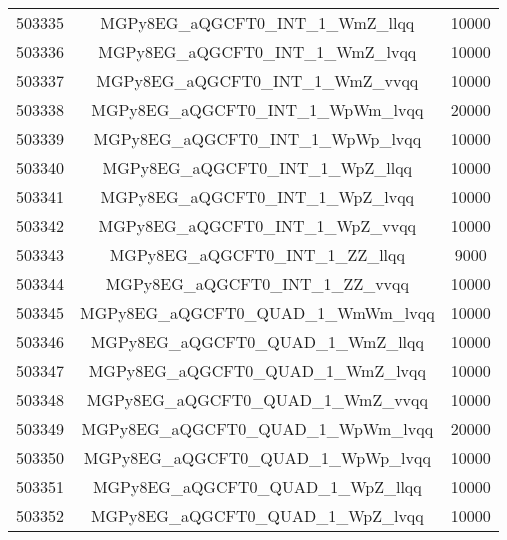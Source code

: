 \begin{table}[!htbp]
\begin{center}
\begin{tabular}{c|c|c}
503335 & MGPy8EG\_aQGCFT0\_INT\_1\_WmZ\_llqq     & 10000 \\
503336 & MGPy8EG\_aQGCFT0\_INT\_1\_WmZ\_lvqq     & 10000 \\
503337 & MGPy8EG\_aQGCFT0\_INT\_1\_WmZ\_vvqq     & 10000 \\
503338 & MGPy8EG\_aQGCFT0\_INT\_1\_WpWm\_lvqq    & 20000 \\
503339 & MGPy8EG\_aQGCFT0\_INT\_1\_WpWp\_lvqq    & 10000 \\
503340 & MGPy8EG\_aQGCFT0\_INT\_1\_WpZ\_llqq     & 10000 \\
503341 & MGPy8EG\_aQGCFT0\_INT\_1\_WpZ\_lvqq     & 10000 \\
503342 & MGPy8EG\_aQGCFT0\_INT\_1\_WpZ\_vvqq     & 10000 \\
503343 & MGPy8EG\_aQGCFT0\_INT\_1\_ZZ\_llqq      & 9000 \\
503344 & MGPy8EG\_aQGCFT0\_INT\_1\_ZZ\_vvqq      & 10000 \\
503345 & MGPy8EG\_aQGCFT0\_QUAD\_1\_WmWm\_lvqq   & 10000 \\
503346 & MGPy8EG\_aQGCFT0\_QUAD\_1\_WmZ\_llqq    & 10000 \\
503347 & MGPy8EG\_aQGCFT0\_QUAD\_1\_WmZ\_lvqq    & 10000 \\
503348 & MGPy8EG\_aQGCFT0\_QUAD\_1\_WmZ\_vvqq    & 10000 \\
503349 & MGPy8EG\_aQGCFT0\_QUAD\_1\_WpWm\_lvqq   & 20000 \\
503350 & MGPy8EG\_aQGCFT0\_QUAD\_1\_WpWp\_lvqq   & 10000 \\
503351 & MGPy8EG\_aQGCFT0\_QUAD\_1\_WpZ\_llqq    & 10000 \\
503352 & MGPy8EG\_aQGCFT0\_QUAD\_1\_WpZ\_lvqq    & 10000 \\


\hline
\end{tabular}
\label{tabular:mc_samples_aqgc_5}
\end{center}
\end{table}


